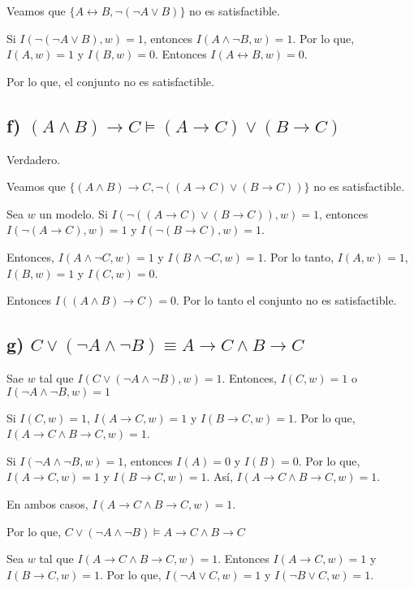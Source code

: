 \documentclass[spanish]{article}
\begin{document}
Veamos que $\{A\leftrightarrow B, \neg (\neg A \vee B)\}$ no es satisfactible.

Si $I(\neg (\neg A \vee B),w) =1$, entonces $I(A\wedge \neg B,w) =1$. Por lo que, $I(A,w) =1$ y $I(B,w)=0$. Entonces $I(A\leftrightarrow B,w)=0$.

Por lo que, el conjunto no es satisfactible.

\subsection*{ f) $(A \wedge B) \rightarrow C \models (A \rightarrow C) \vee (B \rightarrow C)$ }

Verdadero.

Veamos que $\{(A \wedge B) \rightarrow C, \neg ((A \rightarrow C) \vee (B \rightarrow C))\}$ no es satisfactible.

Sea $w$ un modelo. Si $I(\neg ((A \rightarrow C) \vee (B \rightarrow C)),w) = 1$, entonces $I(\neg( A \rightarrow C),w) =1$ y $I(\neg (B \rightarrow C),w)=1$.

Entonces, $I(A\wedge \neg C,w) = 1$ y $I(B\wedge \neg C,w)=1$. Por lo tanto, $I(A,w)=1$, $I(B,w)=1$ y $I(C,w)=0$.

Entonces $I((A\wedge B)\rightarrow C)=0$. Por lo tanto el conjunto no es satisfactible.

\subsection*{ g) $C \vee (\neg A \wedge \neg B) \equiv A \rightarrow C\wedge B\rightarrow C$}

Sae $w$ tal que $I(C \vee (\neg A \wedge \neg B),w)=1$. Entonces, $I(C,w)=1$ o $I(\neg A \wedge \neg B,w)=1$

Si $I(C,w) = 1$, $I(A\rightarrow C,w) = 1$ y $I(B\rightarrow C,w)=1$. Por lo que, $I(A \rightarrow C\wedge B\rightarrow C, w)=1$.

Si $I(\neg A \wedge \neg B, w)=1$, entonces $I(A)=0$ y $I(B)=0$. Por lo que, $I(A\rightarrow C,w) =1 $ y $I(B\rightarrow C,w)=1$. Así, $I(A \rightarrow C\wedge B\rightarrow C, w)=1$.

En ambos casos, $I(A \rightarrow C\wedge B\rightarrow C, w)=1$.

Por lo que, $C \vee (\neg A \wedge \neg B) \models A \rightarrow C\wedge B\rightarrow C$

Sea $w$ tal que $I(A \rightarrow C\wedge B\rightarrow C, w)=1$. Entonces $I(A\rightarrow C,w) = 1$ y $I(B\rightarrow C,w)=1$. Por lo que, $I(\neg A\vee C,w) = 1$ y $I(\neg B\vee C,w)=1$.
\end{document}
